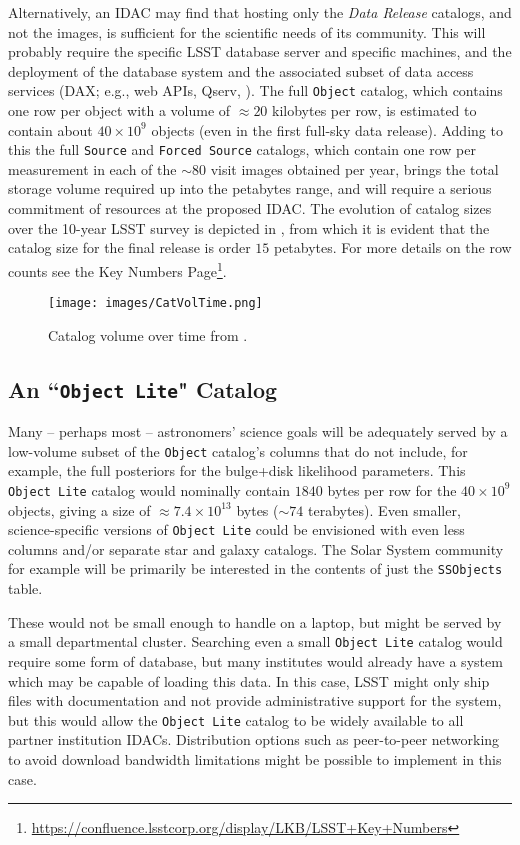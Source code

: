 Alternatively, an IDAC may find that hosting only the {\it Data Release} catalogs, and not the images, is sufficient for the scientific needs of its community. This will probably require the specific LSST database server  and specific machines, and the deployment of the database system and the associated subset of data access services (DAX; e.g., web APIs, Qserv, ). The full {\tt Object} catalog, which contains one row per object with a volume of $\approx 20$ kilobytes per row, is estimated to contain about $40 \times 10^9$ objects (even in the first full-sky data release). Adding to this the full {\tt Source} and {\tt Forced Source} catalogs, which contain one row per measurement in each of the $\sim80$ visit images obtained per year, brings the total storage volume required up into the petabytes range, and will require a serious commitment of resources at the proposed IDAC. The evolution of catalog sizes over the 10-year LSST survey is depicted in , from which it is evident that the catalog size for the final release is order $15$ petabytes. For more details on the row counts see the Key Numbers Page\footnote{\url{https://confluence.lsstcorp.org/display/LKB/LSST+Key+Numbers}}.

\begin{figure}
\begin{center}
\texttt{[image: images/CatVolTime.png]}
\caption{Catalog volume over time from . \label{fig:catvol}}
\end{center}
\end{figure}

\subsection{An ``{\tt Object Lite}" Catalog}\label{sec:lite}

Many -- perhaps most -- astronomers' science goals will be adequately served by a low-volume subset of the {\tt Object} catalog's columns that do not include, for example, the full posteriors for the bulge+disk likelihood parameters.
This {\tt Object Lite} catalog would nominally contain $1840$ bytes per row for the $40 \times 10^{9}$ objects, giving a size of $\approx 7.4 \times 10^{13}$ bytes ($\sim74$ terabytes).
Even smaller, science-specific versions of {\tt Object Lite} could be envisioned with even less columns and/or separate star and galaxy catalogs.
The Solar System community for example will be primarily be interested in the contents of  just the  {\tt SSObjects} table.

These would not be small enough to handle on a laptop, but might be served by a small departmental cluster.
Searching even a small {\tt Object Lite} catalog would require some form of database, but many institutes would already have a system which may be capable of loading this data.
In this case, LSST might only ship files with documentation and not provide administrative support for the system, but this would allow the {\tt Object Lite} catalog to be widely available to all partner institution IDACs. Distribution options such as peer-to-peer networking to avoid download bandwidth limitations might be possible to implement in this case.

